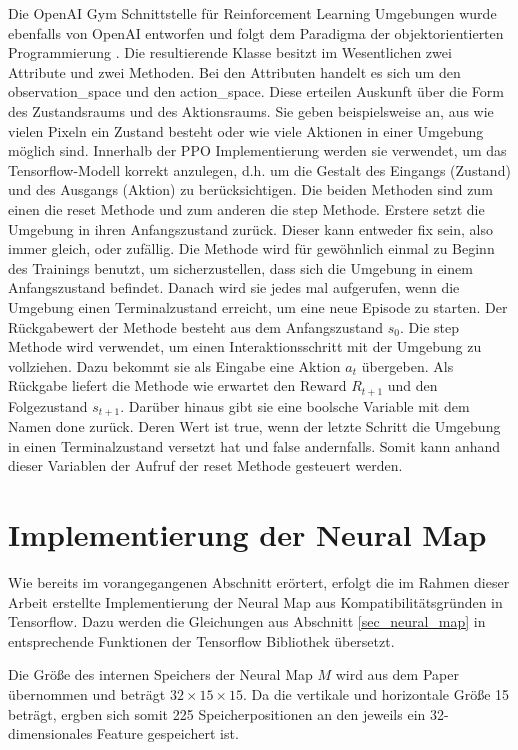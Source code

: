 Die OpenAI Gym Schnittstelle für Reinforcement Learning Umgebungen wurde ebenfalls von OpenAI entworfen und folgt dem Paradigma der objektorientierten Programmierung \cite{Gym}. Die resultierende Klasse besitzt im Wesentlichen zwei Attribute und zwei Methoden. Bei den Attributen handelt es sich um den observation\_space und den action\_space. Diese erteilen Auskunft über die Form des Zustandsraums und des Aktionsraums. Sie geben beispielsweise an, aus wie vielen Pixeln ein Zustand besteht oder wie viele Aktionen in einer Umgebung möglich sind. Innerhalb der PPO Implementierung werden sie verwendet, um das Tensorflow-Modell korrekt anzulegen, d.h. um die Gestalt des Eingangs (Zustand) und des Ausgangs (Aktion) zu berücksichtigen. Die beiden Methoden sind zum einen die reset Methode und zum anderen die step Methode. Erstere setzt die Umgebung in ihren Anfangszustand zurück. Dieser kann entweder fix sein, also immer gleich, oder zufällig. Die Methode wird für gewöhnlich einmal zu Beginn des Trainings benutzt, um sicherzustellen, dass sich die Umgebung in einem Anfangszustand befindet. Danach wird sie jedes mal aufgerufen, wenn die Umgebung einen Terminalzustand erreicht, um eine neue Episode zu starten. Der Rückgabewert der Methode besteht aus dem Anfangszustand $s_0$. Die step Methode wird verwendet, um einen Interaktionsschritt mit der Umgebung zu vollziehen. Dazu bekommt sie als Eingabe eine Aktion $a_t$ übergeben. Als Rückgabe liefert die Methode wie erwartet den Reward $R_{t+1}$ und den Folgezustand $s_{t+1}$. Darüber hinaus gibt sie eine boolsche Variable mit dem Namen done zurück. Deren Wert ist true, wenn der letzte Schritt die Umgebung in einen Terminalzustand versetzt hat und false andernfalls. Somit kann anhand dieser Variablen der Aufruf der reset Methode gesteuert werden.


\section{Implementierung der Neural Map}
\label{sec_nm_impl}

Wie bereits im vorangegangenen Abschnitt erörtert, erfolgt die im Rahmen dieser Arbeit erstellte Implementierung der Neural Map aus Kompatibilitätsgründen in Tensorflow. Dazu werden die Gleichungen aus Abschnitt \ref{sec_neural_map} in entsprechende Funktionen der Tensorflow Bibliothek übersetzt.

Die Größe des internen Speichers der Neural Map $M$ wird aus dem Paper übernommen und beträgt $32 \times 15 \times 15$. Da die vertikale und horizontale Größe 15 beträgt, ergben sich somit 225 Speicherpositionen an den jeweils ein 32-dimensionales Feature gespeichert ist.

